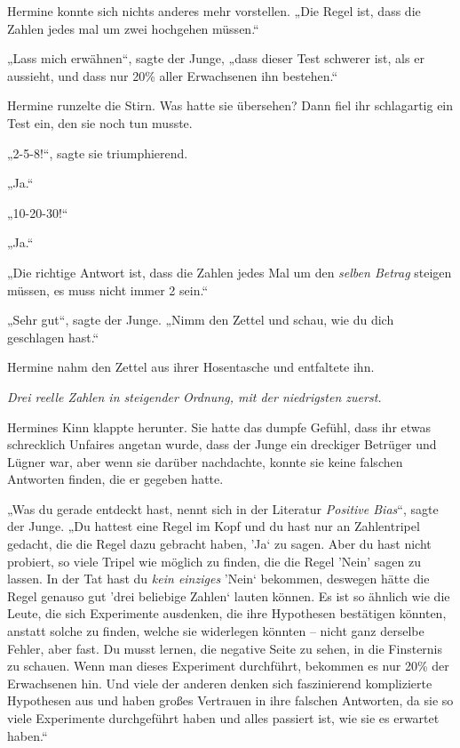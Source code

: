 Hermine konnte sich nichts anderes mehr vorstellen. „Die Regel ist, dass die Zahlen jedes mal um zwei hochgehen müssen.“ 

„Lass mich erwähnen“, sagte der Junge, „dass dieser Test schwerer ist, als er aussieht, und dass nur 20\% aller Erwachsenen ihn bestehen.“ 

Hermine runzelte die Stirn. Was hatte sie übersehen? Dann fiel ihr schlagartig ein Test ein, den sie noch tun musste. 

„2-5-8!“, sagte sie triumphierend. 

„Ja.“ 

„10-20-30!“ 

„Ja.“ 

„Die richtige Antwort ist, dass die Zahlen jedes Mal um den \emph{selben Betrag} steigen müssen, es muss nicht immer 2 sein.“ 

„Sehr gut“, sagte der Junge. „Nimm den Zettel und schau, wie du dich geschlagen hast.“ 

Hermine nahm den Zettel aus ihrer Hosentasche und entfaltete ihn. 

\emph{Drei reelle Zahlen in steigender Ordnung, mit der niedrigsten zuerst.} 

Hermines Kinn klappte herunter. Sie hatte das dumpfe Gefühl, dass ihr etwas schrecklich Unfaires angetan wurde, dass der Junge ein dreckiger Betrüger und Lügner war, aber wenn sie darüber nachdachte, konnte sie keine falschen Antworten finden, die er gegeben hatte. 

„Was du gerade entdeckt hast, nennt sich in der Literatur \emph{Positive Bias}“, sagte der Junge. „Du hattest eine Regel im Kopf und du hast nur an Zahlentripel gedacht, die die Regel dazu gebracht haben, ’Ja‘ zu sagen. Aber du hast nicht probiert, so viele Tripel wie möglich zu finden, die die Regel 'Nein' sagen zu lassen. In der Tat hast du \emph{kein einziges} ’Nein‘ bekommen, deswegen hätte die Regel genauso gut ’drei beliebige Zahlen‘ lauten können. Es ist so ähnlich wie die Leute, die sich Experimente ausdenken, die ihre Hypothesen bestätigen könnten, anstatt solche zu finden, welche sie widerlegen könnten – nicht ganz derselbe Fehler, aber fast. Du musst lernen, die negative Seite zu sehen, in die Finsternis zu schauen. Wenn man dieses Experiment durchführt, bekommen es nur 20\% der Erwachsenen hin. Und viele der anderen denken sich faszinierend komplizierte Hypothesen aus und haben großes Vertrauen in ihre falschen Antworten, da sie so viele Experimente durchgeführt haben und alles passiert ist, wie sie es erwartet haben.“ 

